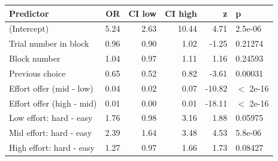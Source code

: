 \begin{table}[ht]
\centering
\begin{tabular}{lrrrrl}
  \hline
Predictor & OR & CI low & CI high & z & p \\ 
  \hline
(Intercept) & 5.24 & 2.63 & 10.44 & 4.71 & 2.5e-06 \\ 
  Trial number in block & 0.96 & 0.90 & 1.02 & -1.25 & 0.21274 \\ 
  Block number & 1.04 & 0.97 & 1.11 & 1.16 & 0.24593 \\ 
  Previous choice & 0.65 & 0.52 & 0.82 & -3.61 & 0.00031 \\ 
  Effort offer (mid - low) & 0.04 & 0.02 & 0.07 & -10.82 & $<$ 2e-16 \\ 
  Effort offer (high - mid) & 0.01 & 0.00 & 0.01 & -18.11 & $<$ 2e-16 \\ 
  Low effort: hard - easy & 1.76 & 0.98 & 3.16 & 1.88 & 0.05975 \\ 
  Mid effort: hard - easy & 2.39 & 1.64 & 3.48 & 4.53 & 5.8e-06 \\ 
  High effort: hard - easy & 1.27 & 0.97 & 1.66 & 1.73 & 0.08427 \\ 
   \hline
\end{tabular}
\end{table}
